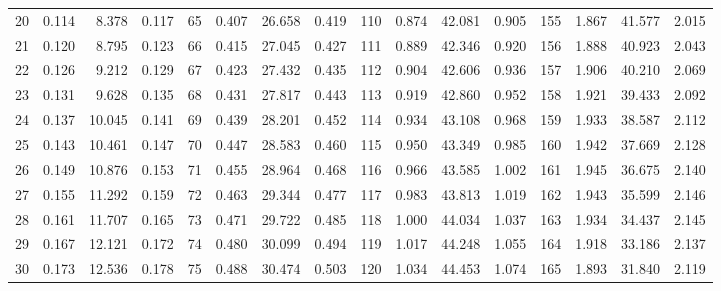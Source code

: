 \begin{table}[!h]
{\begin{tabular}{rrrr|rrrr|rrrr|rrrr}
 20 & \tiny{  0.114} &   8.378 & \tiny{  0.117} &  65 & \tiny{  0.407} &  26.658 & \tiny{  0.419} & 110 & \tiny{  0.874} &  42.081 & \tiny{  0.905} & 155 & \tiny{  1.867} &  41.577 & \tiny{  2.015}\\
 21 & \tiny{  0.120} &   8.795 & \tiny{  0.123} &  66 & \tiny{  0.415} &  27.045 & \tiny{  0.427} & 111 & \tiny{  0.889} &  42.346 & \tiny{  0.920} & 156 & \tiny{  1.888} &  40.923 & \tiny{  2.043}\\
 22 & \tiny{  0.126} &   9.212 & \tiny{  0.129} &  67 & \tiny{  0.423} &  27.432 & \tiny{  0.435} & 112 & \tiny{  0.904} &  42.606 & \tiny{  0.936} & 157 & \tiny{  1.906} &  40.210 & \tiny{  2.069}\\
 23 & \tiny{  0.131} &   9.628 & \tiny{  0.135} &  68 & \tiny{  0.431} &  27.817 & \tiny{  0.443} & 113 & \tiny{  0.919} &  42.860 & \tiny{  0.952} & 158 & \tiny{  1.921} &  39.433 & \tiny{  2.092}\\
 24 & \tiny{  0.137} &  10.045 & \tiny{  0.141} &  69 & \tiny{  0.439} &  28.201 & \tiny{  0.452} & 114 & \tiny{  0.934} &  43.108 & \tiny{  0.968} & 159 & \tiny{  1.933} &  38.587 & \tiny{  2.112}\\
 25 & \tiny{  0.143} &  10.461 & \tiny{  0.147} &  70 & \tiny{  0.447} &  28.583 & \tiny{  0.460} & 115 & \tiny{  0.950} &  43.349 & \tiny{  0.985} & 160 & \tiny{  1.942} &  37.669 & \tiny{  2.128}\\
 26 & \tiny{  0.149} &  10.876 & \tiny{  0.153} &  71 & \tiny{  0.455} &  28.964 & \tiny{  0.468} & 116 & \tiny{  0.966} &  43.585 & \tiny{  1.002} & 161 & \tiny{  1.945} &  36.675 & \tiny{  2.140}\\
 27 & \tiny{  0.155} &  11.292 & \tiny{  0.159} &  72 & \tiny{  0.463} &  29.344 & \tiny{  0.477} & 117 & \tiny{  0.983} &  43.813 & \tiny{  1.019} & 162 & \tiny{  1.943} &  35.599 & \tiny{  2.146}\\
 28 & \tiny{  0.161} &  11.707 & \tiny{  0.165} &  73 & \tiny{  0.471} &  29.722 & \tiny{  0.485} & 118 & \tiny{  1.000} &  44.034 & \tiny{  1.037} & 163 & \tiny{  1.934} &  34.437 & \tiny{  2.145}\\
 29 & \tiny{  0.167} &  12.121 & \tiny{  0.172} &  74 & \tiny{  0.480} &  30.099 & \tiny{  0.494} & 119 & \tiny{  1.017} &  44.248 & \tiny{  1.055} & 164 & \tiny{  1.918} &  33.186 & \tiny{  2.137}\\
 30 & \tiny{  0.173} &  12.536 & \tiny{  0.178} &  75 & \tiny{  0.488} &  30.474 & \tiny{  0.503} & 120 & \tiny{  1.034} &  44.453 & \tiny{  1.074} & 165 & \tiny{  1.893} &  31.840 & \tiny{  2.119}\\

\end{tabular}}
\end{table}

